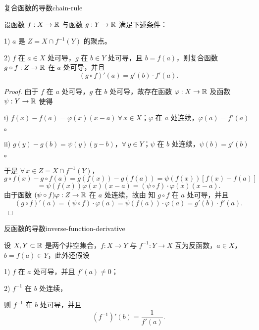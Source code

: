 \begin{mythm}{复合函数的导数}{chain-rule}

	设函数 \(f:X\to\mathbb{R}\) 与函数 \(g:Y\to\mathbb{R}\) 满足下述条件：

	1) \(a\) 是 \(Z=X\cap f^{-1}(Y)\) 的聚点。

	2) \(f\) 在 \(a\in X\) 处可导，\(g\) 在 \(b\in Y\) 处可导，且 \(b=f(a)\)，则复合函数 \(g\circ f:Z\to\mathbb{R}\) 在 \(a\) 处可导，并且
	\[
	(g\circ f)'(a)=g'(b)\cdot f'(a).
	\]

\end{mythm}

\begin{proof}

	由于 \(f\) 在 \(a\) 处可导，\(g\) 在 \(b\) 处可导，故存在函数 \(\varphi:X\to\mathbb{R}\) 及函数 \(\psi:Y\to\mathbb{R}\) 使得

	i) \(f(x)-f(a)=\varphi(x)(x-a)\ \forall\,x\in X\)；\(\varphi\) 在 \(a\) 处连续，\(\varphi(a)=f'(a)\)。

	ii) \(g(y)-g(b)=\psi(y)(y-b)\)，\(\forall\,y\in Y\)；\(\psi\) 在 \(b\) 处连续，\(\psi(b)=g'(b)\)。

	于是 \(\forall\,x\in Z=X\cap f^{-1}(Y)\)，
	\[
	g\circ f(x)-g\circ f(a)=g(f(x))-g(f(a))=\psi(f(x))[f(x)-f(a)]
	\]
	\[
	=\psi(f(x))\varphi(x)(x-a)=(\psi\circ f)\cdot\varphi(x)(x-a).
	\]
	由于函数 \((\psi\circ f)\varphi:Z\to\mathbb{R}\) 在 \(a\) 处连续，故由 知 \(g\circ f\) 在 \(a\) 处可导，并且
	\[
	(g\circ f)'(a)=(\psi\circ f)\cdot\varphi(a)=\psi(f(a))\cdot\varphi(a)=g'(b)\cdot f'(a).
	\]

\end{proof}

\begin{mythm}{反函数的导数}{inverse-function-derivative}

	设 \(X,Y\subset\mathbb{R}\) 是两个非空集合，\(f:X\to Y\) 与 \(f^{-1}:Y\to X\) 互为反函数，\(a\in X\)，\(b=f(a)\in Y\)，此外还假设

	1) \(f\) 在 \(a\) 处可导，并且 \(f'(a)\neq0\)；

	2) \(f^{-1}\) 在 \(b\) 处连续，

	则 \(f^{-1}\) 在 \(b\) 处可导，并且
	\[
	(f^{-1})'(b)=\frac1{f'(a)}.
	\]

\end{mythm}

